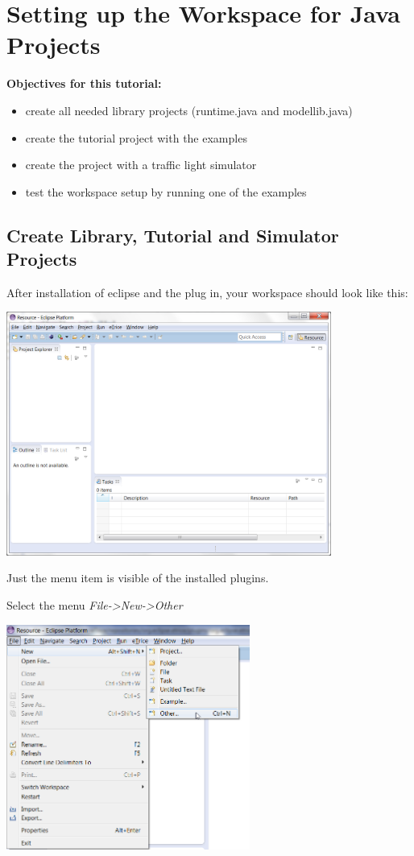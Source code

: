 \section{Setting up the Workspace for Java Projects}

\textbf{Objectives for this tutorial:}
\begin{itemize}
	\item create all needed library projects (runtime.java and modellib.java)
	\item create the tutorial project with the examples
	\item create the project with a traffic light simulator
	\item test the workspace setup by running one of the examples
\end{itemize}

\subsection{Create Library, Tutorial and Simulator Projects}

After installation of eclipse and the \eTrice{} plug in, your workspace should look like this:  

\includegraphics[width=0.8\textwidth]{images/013-SetupWorkspace01.png}

Just the \eTrice{} menu item is visible of the installed \eTrice{} plugins.

\newpage
Select the menu \emph{File->New->Other}

\includegraphics[width=0.6\textwidth]{images/013-SetupWorkspace02.png}

